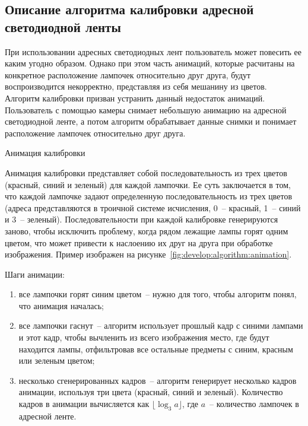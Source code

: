 \subsection{Описание алгоритма калибровки адресной светодиодной ленты}
\label{sec:develop:algorithm}

При использовании адресных светодиодных лент пользователь может повесить ее каким угодно образом. Однако при этом часть анимаций, которые расчитаны на конкретное расположение лампочек относительно друг друга, будут воспроизводится некорректно, представляя из себя мешанину из цветов. Алгоритм калибровки призван устранить данный недостаток анимаций. Пользователь с помощью камеры снимает небольшую анимацию на адресной светодиодной ленте, а потом алгоритм обрабатывает данные снимки и понимает расположение лампочек относительно друг друга.

Анимация калибровки
\label{sec:develop:algorithm:animation}

Анимация калибровки представляет собой последовательность из трех цветов (красный, синий и зеленый) для каждой лампочки. Ее суть заключается в том, что каждой лампочке задают определенную последовательность из трех цветов (адреса представляются в троичной системе исчисления, 0~-- красный, 1~-- синий и 3~-- зеленый). Последовательности при каждой калибровке генерируются заново, чтобы исключить проблему, когда рядом лежащие лампы горят одним цветом, что может привести к наслоению их друг на друга при обработке изображения. Пример изображен на рисунке~\ref{fig:develop:algorithm:animation}.

Шаги анимации:
\begin{enumerate}[label=\arabic*]
	\item все лампочки горят синим цветом~-- нужно для того, чтобы алгоритм понял, что анимация началась;
	\item все лампочки гаснут~-- алгоритм использует прошлый кадр с синими лампами и этот кадр, чтобы вычленить из всего изображения место, где будут находится лампы, отфильтровав все остальные предметы с синим, красным или зеленым цветом;
	\item несколько сгенерированных кадров~-- алгоритм генерирует несколько кадров анимации, используя три цвета (красный, синий и зеленый). Количество кадров в анимации вычисляется как $\lfloor\log_3 a\rfloor$, где $a$~-- количество лампочек в адресной ленте.
\end{enumerate}

